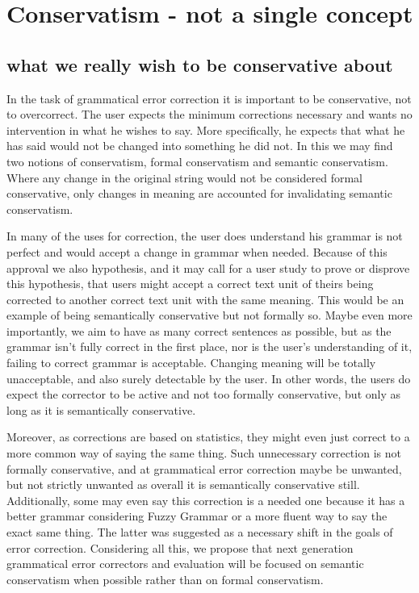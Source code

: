\documentclass[11pt]{article}
\begin{document}
\section{Conservatism - not a single concept}

\subsection{what we really wish to be conservative about}

In the task of grammatical error correction it is important to be
conservative, not to overcorrect. The user expects the minimum corrections
necessary and wants no intervention in what he wishes to say. More
specifically, he expects that what he has said would not be changed
into something he did not. In this we may find two notions of conservatism,
formal conservatism and semantic conservatism. Where any change in
the original string would not be considered formal conservative, only
changes in meaning are accounted for invalidating semantic conservatism. 

In many of the uses for correction,
the user does understand his grammar is not perfect and would accept
a change in grammar when needed. Because of this approval we also
hypothesis, and it may call for a user study to prove or disprove
this hypothesis, that users might accept a correct text unit of theirs
being corrected to another correct text unit with the same meaning.
This would be an example of being semantically conservative but not formally so.
Maybe even more importantly, we aim to have as many correct sentences
as possible, but as the grammar isn't fully correct in the first place,
nor is the user's understanding of it, failing to correct grammar
is acceptable. Changing meaning will be totally unacceptable, and
also surely detectable by the user. In other words, the users do expect
the corrector to be active and not too formally conservative, but
only as long as it is semantically conservative. 

Moreover, as corrections are based on statistics, they might even
just correct to a more common way of saying the same thing. Such unnecessary
correction is not formally conservative, and at grammatical error
correction maybe be unwanted, but not strictly unwanted as overall
it is semantically conservative still. Additionally, some may even
say this correction is a needed one because it has a better grammar considering
Fuzzy Grammar\cite{lakoff1973fuzzy,madnani2011they} or a more fluent
way to say the exact same thing. The latter was suggested as a necessary
shift in the goals of error correction\cite{sakaguchi2016reassessing}.
Considering all this, we propose that next generation grammatical
error correctors and evaluation will be focused on semantic conservatism
when possible rather than on formal conservatism.
\end{document}
